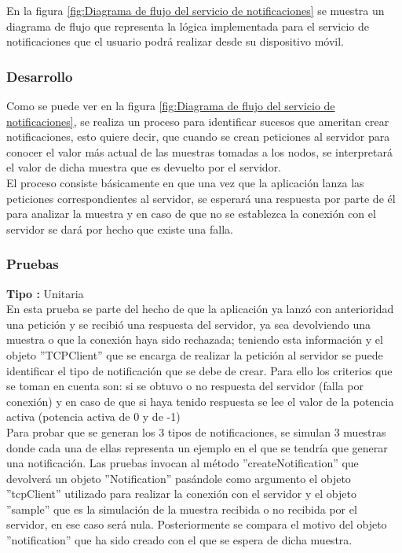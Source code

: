 En la figura \ref{fig:Diagrama de flujo del servicio de notificaciones} se muestra un diagrama de flujo que representa la lógica implementada para el servicio de notificaciones que el usuario podrá realizar desde su dispositivo móvil.\\ \newline

\subsubsection{Desarrollo}
Como se puede ver en la figura \ref{fig:Diagrama de flujo del servicio de notificaciones}, se realiza un proceso para identificar sucesos que ameritan crear notificaciones, esto quiere decir, que cuando se crean peticiones al servidor para conocer el valor más actual de las muestras tomadas a los nodos, se interpretará el valor de dicha muestra que es devuelto por el servidor.
\\ \newline
El proceso consiste básicamente en que una vez que la aplicación lanza las peticiones correspondientes al servidor, se esperará una respuesta por parte de él para analizar la muestra y en caso de que no se establezca la conexión con el servidor se dará por hecho que existe una falla.

\subsubsection{Pruebas}
\textbf{Tipo :} Unitaria \\ \newline
En esta prueba se parte del hecho de que la aplicación ya lanzó con anterioridad una petición y se recibió una respuesta del servidor, ya sea devolviendo una muestra o que la conexión haya sido rechazada; teniendo esta información y el objeto ''TCPClient'' que se encarga de realizar la petición al servidor se puede identificar el tipo de notificación que se debe de crear.
Para ello los criterios que se toman en cuenta son: si se obtuvo o no respuesta del servidor (falla por conexión) y en caso de que si haya tenido respuesta se lee el valor de la potencia activa (potencia activa de 0 y de -1)
\\ \newline
Para probar que se generan los 3 tipos de notificaciones, se simulan 3 muestras donde cada una de ellas representa un ejemplo en el que se tendría que generar una notificación. Las pruebas invocan al método ''createNotification'' que devolverá un objeto ''Notification'' pasándole como argumento el objeto ''tcpClient'' utilizado para realizar la conexión con el servidor y el objeto ''sample'' que es la simulación de la muestra recibida o no recibida por el servidor, en ese caso será nula. Posteriormente se compara el motivo del objeto ''notification'' que ha sido creado con el que se espera de dicha muestra.  

